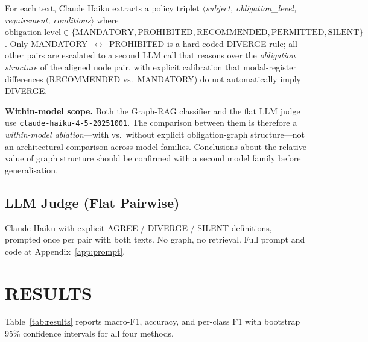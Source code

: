 \documentclass[manuscript]{acmart}
\makeatletter
\let\@acmt@@section\section
\renewcommand{\section}[1]{%
  \@acmt@@section{\texorpdfstring{\MakeUppercase{#1}}{#1}}}
\makeatother
\begin{document}
For each text, Claude Haiku extracts a policy triplet
$\langle$\textit{subject, obligation\_level, requirement, conditions}$\rangle$
where $\text{obligation\_level} \in \{\text{MANDATORY}, \text{PROHIBITED},
\text{RECOMMENDED}, \text{PERMITTED}, \text{SILENT}\}$. Only
MANDATORY~$\leftrightarrow$~PROHIBITED is a hard-coded DIVERGE rule; all other
pairs are escalated to a second LLM call that reasons over the
\textit{obligation structure} of the aligned node pair, with explicit
calibration that modal-register differences (RECOMMENDED vs.\ MANDATORY) do not
automatically imply DIVERGE.

\textbf{Within-model scope.} Both the Graph-RAG classifier and the flat LLM
judge use \texttt{claude-haiku-4-5-20251001}. The comparison between them is
therefore a \textit{within-model ablation}---with vs.\ without explicit
obligation-graph structure---not an architectural comparison across model
families. Conclusions about the relative value of graph structure should be
confirmed with a second model family before generalisation.

\subsection{LLM Judge (Flat Pairwise)}

Claude Haiku with explicit AGREE / DIVERGE / SILENT definitions, prompted once
per pair with both texts. No graph, no retrieval. Full prompt and code at
Appendix~\ref{app:prompt}.

\section{Results}
\label{sec:results}

Table~\ref{tab:results} reports macro-F1, accuracy, and per-class F1 with
bootstrap 95\% confidence intervals for all four methods.
\end{document}
